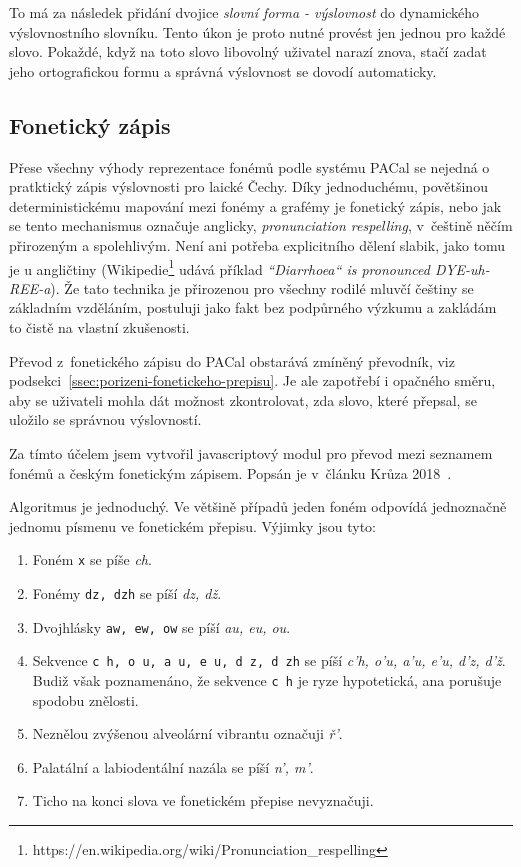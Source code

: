 To má za následek přidání dvojice {\em slovní forma - výslovnost} do dynamického
výslovnostního slovníku. Tento úkon je proto nutné provést jen jednou pro každé
slovo. Pokaždé, když na toto slovo libovolný uživatel narazí znova, stačí zadat jeho
ortografickou formu a správná výslovnost se dovodí automaticky.

\subsection{Fonetický zápis}
\label{ssec:respelling}

Přese všechny výhody reprezentace fonémů podle systému PACal se nejedná o
pratktický zápis výslovnosti pro laické Čechy. Díky jednoduchému, povětšinou
deterministickému mapování mezi fonémy a grafémy je fonetický zápis, nebo jak
se tento mechanismus označuje anglicky, {\em pronunciation respelling},
v~češtině něčím přirozeným a spolehlivým. Není ani potřeba explicitního dělení
slabik, jako tomu je u angličtiny
(Wikipedie\footnote{https://en.wikipedia.org/wiki/Pronunciation\_respelling}
udává příklad {\em ``Diarrhoea`` is pronounced DYE-uh-REE-a}).
Že tato technika je přirozenou pro všechny rodilé mluvčí češtiny se základním vzděláním,
postuluji jako fakt bez podpůrného výzkumu a zakládám to čistě na vlastní
zkušenosti.

Převod z~fonetického zápisu do PACal obstarává zmíněný převodník, viz
podsekci~\ref{ssec:porizeni-fonetickeho-prepisu}. Je ale zapotřebí i opačného
směru, aby se uživateli mohla dát možnost zkontrolovat, zda slovo, které
přepsal, se uložilo se správnou výslovností.

Za tímto účelem jsem vytvořil javascriptový modul pro převod mezi seznamem
fonémů a českým fonetickým zápisem. Popsán je v~článku Krůza 2018~\cite{biblio:KrPhoneticTranscription2018}.

Algoritmus je jednoduchý. Ve většině případů jeden foném odpovídá jednoznačně
jednomu písmenu ve fonetickém přepisu. Výjimky jsou tyto:
\begin{enumerate}
\item{Foném \texttt{x} se píše {\em ch}.}
\item{Fonémy \texttt{dz, dzh} se píší {\em dz, dž}.}
\item{Dvojhlásky \texttt{aw, ew, ow} se píší {\em au, eu, ou}.}
\item{
    Sekvence \texttt{c h, o u, a u, e u, d z, d zh} se píší
    {\em c'h, o'u, a'u, e'u, d'z, d'ž}.
    Budiž však poznamenáno, že sekvence \texttt{c h} je ryze hypotetická, ana
    porušuje spodobu znělosti.
}
\item{
    Neznělou zvýšenou alveolární vibrantu označuji {\em ř'}.
}
\item{
    Palatální a labiodentální nazála se píší {\em n', m'}.
}
\item{Ticho na konci slova ve fonetickém přepise nevyznačuji.}
\end{enumerate}

